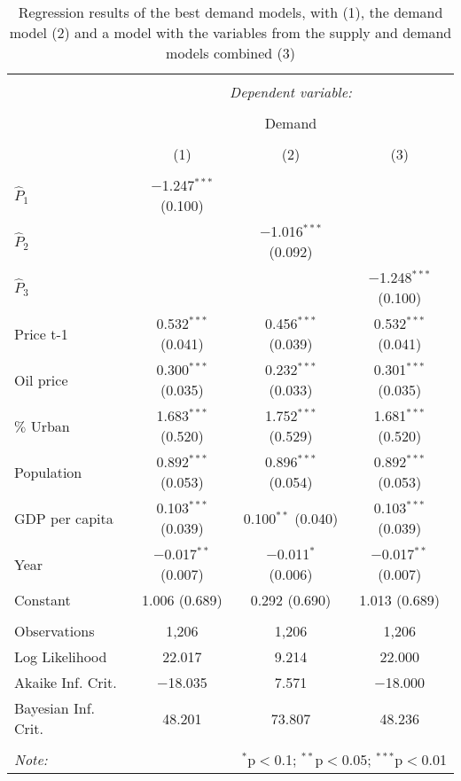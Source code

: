 
\begin{table}[H] \centering 
  \caption{Regression results of the best demand models, with (1), the demand model (2) and a model with the variables from the supply and demand models combined (3)} 
  \label{table:table_demand} 
\scriptsize 
\begin{tabular}{@{\extracolsep{5pt}}lccc} 
\\[-1.8ex]\hline 
\hline \\[-1.8ex] 
 & \multicolumn{3}{c}{\textit{Dependent variable:}} \\ 
\cline{2-4} 
\\[-1.8ex] & \multicolumn{3}{c}{Demand} \\ 
\\[-1.8ex] & (1) & (2) & (3)\\ 
\hline \\[-1.8ex] 
 $\hat{P}_{1}$ & $-$1.247$^{***}$ (0.100) &  &  \\ 
  $\hat{P}_{2}$ &  & $-$1.016$^{***}$ (0.092) &  \\ 
  $\hat{P}_{3}$ &  &  & $-$1.248$^{***}$ (0.100) \\ 
  Price t-1 & 0.532$^{***}$ (0.041) & 0.456$^{***}$ (0.039) & 0.532$^{***}$ (0.041) \\ 
  Oil price & 0.300$^{***}$ (0.035) & 0.232$^{***}$ (0.033) & 0.301$^{***}$ (0.035) \\ 
  $\%$ Urban & 1.683$^{***}$ (0.520) & 1.752$^{***}$ (0.529) & 1.681$^{***}$ (0.520) \\ 
  Population & 0.892$^{***}$ (0.053) & 0.896$^{***}$ (0.054) & 0.892$^{***}$ (0.053) \\ 
  GDP per capita & 0.103$^{***}$ (0.039) & 0.100$^{**}$ (0.040) & 0.103$^{***}$ (0.039) \\ 
  Year & $-$0.017$^{**}$ (0.007) & $-$0.011$^{*}$ (0.006) & $-$0.017$^{**}$ (0.007) \\ 
  Constant & 1.006 (0.689) & 0.292 (0.690) & 1.013 (0.689) \\ 
 \hline \\[-1.8ex] 
Observations & 1,206 & 1,206 & 1,206 \\ 
Log Likelihood & 22.017 & 9.214 & 22.000 \\ 
Akaike Inf. Crit. & $-$18.035 & 7.571 & $-$18.000 \\ 
Bayesian Inf. Crit. & 48.201 & 73.807 & 48.236 \\ 
\hline 
\hline \\[-1.8ex] 
\textit{Note:}  & \multicolumn{3}{r}{$^{*}$p$<$0.1; $^{**}$p$<$0.05; $^{***}$p$<$0.01} \\ 
\end{tabular} 
\end{table} 
